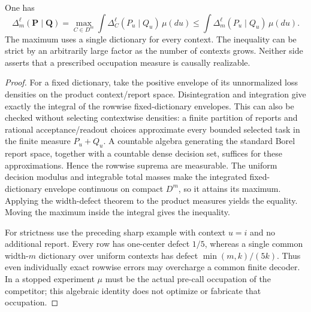 \begin{proposition}\label{prop:occupation-defect}
One has
\begin{equation}\label{eq:occupation-defect}
 \Delta_m^\ell(\mathbf P\mid\mathbf Q)
   =\max_{C\in D^m}\int\Delta_C^\ell(P_u\mid Q_u)\,\mu(du)
   \le\int\Delta_m^\ell(P_u\mid Q_u)\,\mu(du).
\end{equation}
The maximum uses a single dictionary for every context. The inequality can be strict by an arbitrarily large factor as the number of contexts grows. Neither side asserts that a prescribed occupation measure is causally realizable.
\end{proposition}
\begin{proof}
For a fixed dictionary, take the positive envelope of its unnormalized loss densities on the product context/report space. Disintegration and integration give exactly the integral of the rowwise fixed-dictionary envelopes. This can also be checked without selecting contextwise densities: a finite partition of reports and rational acceptance/readout choices approximate every bounded selected task in the finite measure $P_u+Q_u$. A countable algebra generating the standard Borel report space, together with a countable dense decision set, suffices for these approximations. Hence the rowwise suprema are measurable. The uniform decision modulus and integrable total masses make the integrated fixed-dictionary envelope continuous on compact $D^m$, so it attains its maximum. Applying the width-defect theorem to the product measures yields the equality. Moving the maximum inside the integral gives the inequality.

For strictness use the preceding sharp example with context $u=i$ and no additional report. Every row has one-center defect $1/5$, whereas a single common width-$m$ dictionary over uniform contexts has defect $\min(m,k)/(5k)$. Thus even individually exact rowwise errors may overcharge a common finite decoder. In a stopped experiment $\mu$ must be the actual pre-call occupation of the competitor; this algebraic identity does not optimize or fabricate that occupation.
\end{proof}

